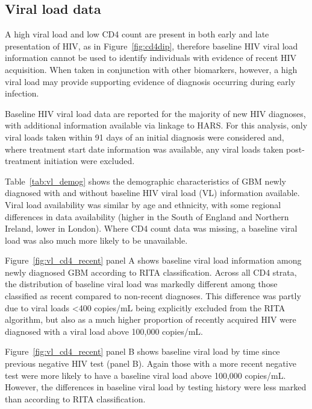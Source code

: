 \subsection{Viral load data}

A high viral load and low CD4 count are present in both early and late presentation of HIV, as in Figure~\ref{fig:cd4dip}, therefore baseline HIV viral load information cannot be used to identify individuals with evidence of recent HIV acquisition. When taken in conjunction with other biomarkers, however, a high viral load may provide supporting evidence of diagnosis occurring during early infection.

Baseline HIV viral load data are reported for the majority of new HIV diagnoses, with additional information available via linkage to HARS\@. For this analysis, only viral loads taken within 91 days of an initial diagnosis were considered and, where treatment start date information was available, any viral loads taken post-treatment initiation were excluded.

Table~\ref{tab:vl_demog} shows the demographic characteristics of GBM newly diagnosed with and without baseline HIV viral load (VL) information available. Viral load availability was similar by age and ethnicity, with some regional differences in data availability (higher in the South of England and Northern Ireland, lower in London). Where CD4 count data was missing, a baseline viral load was also much more likely to be unavailable.



Figure~\ref{fig:vl_cd4_recent} panel A shows baseline viral load information among newly diagnosed GBM according to RITA classification. Across all CD4 strata, the distribution of baseline viral load was markedly different among those classified as recent compared to non-recent diagnoses. This difference was partly due to viral loads <400 copies/mL being explicitly excluded from the RITA algorithm, but also as a much higher proportion of recently acquired HIV were diagnosed with a viral load above 100,000 copies/mL.

Figure~\ref{fig:vl_cd4_recent} panel B shows baseline viral load by time since previous negative HIV test (panel B). Again those with a more recent negative test were more likely to have a baseline viral load above 100,000 copies/mL. However, the differences in baseline viral load by testing history were less marked than according to RITA classification.
\newline
\newline

